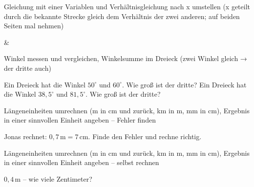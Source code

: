 \begin{aufgabe}{Gleichung mit einer Variablen und Verhältnisgleichung nach x umstellen (x geteilt durch die bekannte Strecke gleich dem Verhältnis der zwei anderen; auf beiden Seiten mal nehmen)}
\begin{gleichungsraster}[2]
 &
 \\
\end{gleichungsraster}
\end{aufgabe}

\begin{aufgabe}{Winkel messen und vergleichen, Winkelsumme im Dreieck (zwei Winkel gleich → der dritte auch)}
\begin{teile}
\teil Ein Dreieck hat die Winkel $50^\circ$ und $60^\circ$. Wie groß ist der dritte? \leerfeld[°]
\teil Ein Dreieck hat die Winkel $38{,}5^\circ$ und $81{,}5^\circ$. Wie groß ist der dritte? \leerfeld[°]
\end{teile}
\end{aufgabe}

\begin{aufgabe}{Längeneinheiten umrechnen (m in cm und zurück, km in m, mm in cm), Ergebnis in einer sinnvollen Einheit angeben – Fehler finden}
\begin{teile}
\teil Jonas rechnet: $0{,}7\,\text{m} = 7\,\text{cm}$. Finde den Fehler und rechne richtig.
\end{teile}
\end{aufgabe}

\begin{aufgabe}{Längeneinheiten umrechnen (m in cm und zurück, km in m, mm in cm), Ergebnis in einer sinnvollen Einheit angeben – selbst rechnen}
\begin{teile}
\teil $0{,}4\,\text{m}$ – wie viele Zentimeter? \leerfeld[cm]
\end{teile}
\end{aufgabe}
